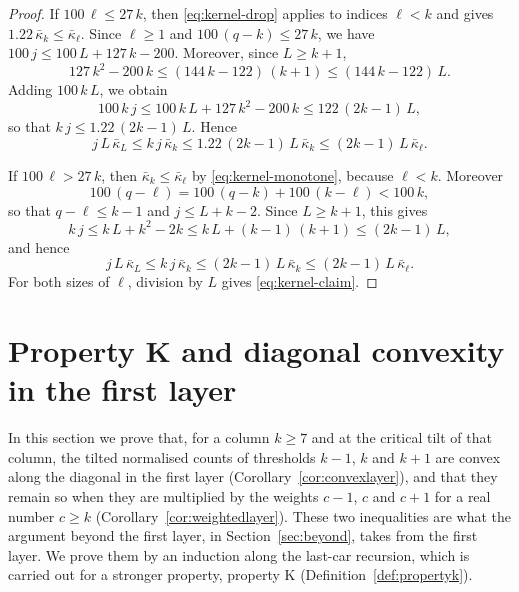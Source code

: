 \documentclass{amsart}
\makeatletter
\theoremstyle{definition}
\theoremstyle{remark}
\numberwithin{equation}{section}
\def\subsection{\@startsection{subsection}{2}\z@{.5\linespacing\@plus.7\linespacing}{-.5em}{\normalfont\bfseries\boldmath}}
\makeatother
\begin{document}
\begin{proof}
If $100\,\ell\le27\,k$, then \eqref{eq:kernel-drop} applies to
indices $\ell<k$ and gives $1.22\,\bar\kappa_k\le\bar\kappa_\ell$. Since
$\ell\ge1$ and $100\,(q-k)\le27\,k$, we have $100\,j\le100\,L+127\,k-200$.
Moreover, since $L\ge k+1$,
\[
127\,k^2-200\,k\le(144\,k-122)\,(k+1)\le(144\,k-122)\,L .
\]
Adding $100\,k\,L$, we obtain
\[
100\,k\,j\le100\,k\,L+127\,k^2-200\,k\le122\,(2k-1)\,L ,
\]
so that $k\,j\le1.22\,(2k-1)\,L$. Hence
\[
j\,L\,\bar\kappa_L\le k\,j\,\bar\kappa_k\le1.22\,(2k-1)\,L\,\bar\kappa_k
\le(2k-1)\,L\,\bar\kappa_\ell .
\]

If $100\,\ell>27\,k$, then $\bar\kappa_k\le\bar\kappa_\ell$ by
\eqref{eq:kernel-monotone}, because $\ell<k$. Moreover
\[
100\,(q-\ell)=100\,(q-k)+100\,(k-\ell)<100\,k ,
\]
so that $q-\ell\le k-1$ and $j\le L+k-2$. Since $L\ge k+1$, this gives
\[
k\,j\le k\,L+k^2-2k\le k\,L+(k-1)\,(k+1)\le(2k-1)\,L ,
\]
and hence
\[
j\,L\,\bar\kappa_L\le k\,j\,\bar\kappa_k\le(2k-1)\,L\,\bar\kappa_k
\le(2k-1)\,L\,\bar\kappa_\ell .
\]
For both sizes of $\ell$, division by $L$ gives \eqref{eq:kernel-claim}.
\end{proof}

\section{Property K and diagonal convexity in the first layer}\label{sec:propk}
In this section we prove that, for a column $k\ge7$ and at the critical tilt
of that column, the tilted normalised counts of thresholds $k-1$, $k$ and
$k+1$ are convex along the diagonal in the first layer
(Corollary~\ref{cor:convexlayer}), and that they remain so when they are
multiplied by the weights $c-1$, $c$ and $c+1$ for a real number $c\ge k$
(Corollary~\ref{cor:weightedlayer}). These two inequalities are what the
argument beyond the first layer, in Section~\ref{sec:beyond}, takes from the
first layer. We prove them by an induction along the last-car recursion,
which is carried out for a stronger property,
property K (Definition~\ref{def:propertyk}).

\subsection{Diagonal triples}\label{subsec:propk-triples}
\end{document}
